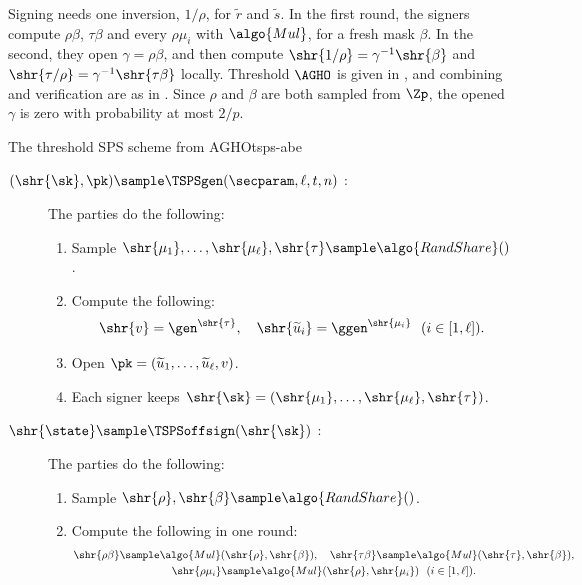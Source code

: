 Signing needs one inversion, $1/\rho$, for $\widetilde{r}$ and
$\widetilde{s}$. In the first round, the signers compute $\rho\beta$,
$\tau\beta$ and every $\rho\mu_i$ with $\algo{Mul}$, for a fresh mask $\beta$.
In the second, they open $\gamma = \rho\beta$, and then compute $\shr{1/\rho} =
\gamma^{-1}\shr{\beta}$ and $\shr{\tau/\rho} = \gamma^{-1}\shr{\tau\beta}$
locally. Threshold $\AGHO$ is given in , and combining and
verification are as in . Since $\rho$ and $\beta$ are
both sampled from $\Zp$, the opened $\gamma$ is zero with probability at most
$2/p$.

\begin{protocolbox}{The threshold SPS scheme from AGHO}{tsps-abe}

  \begin{description}

    \item[$(\shr{\sk}, \pk) \sample \TSPSgen(\secparam, \ell, t, n)$ :] The
parties do the following:

      \begin{enumerate}

	\item Sample $\shr{\mu_1}, \ldots, \shr{\mu_\ell}, \shr{\tau} \sample
\algo{RandShare}()$.

	\item Compute the following:
	  \begin{equation*}
	    \shr{v} = \gen^{\shr{\tau}}, \quad \shr{\widetilde{u}_i} = \ggen^{\shr{\mu_i}} \ \ (i \in [1,\ell]).
	  \end{equation*}

	\item Open $\pk = (\widetilde{u}_1, \ldots, \widetilde{u}_\ell, v)$.

	\item Each signer keeps $\shr{\sk} = (\shr{\mu_1}, \ldots,
\shr{\mu_\ell}, \shr{\tau})$.

      \end{enumerate}

    \item[$\shr{\state} \sample \TSPSoffsign(\shr{\sk})$ :] The parties do the
following:

      \begin{enumerate}

	\item Sample $\shr{\rho}, \shr{\beta} \sample \algo{RandShare}()$.

	\item Compute the following in one round:
	  \begin{gather*}
	    \shr{\rho\beta} \sample \algo{Mul}(\shr{\rho}, \shr{\beta}), \quad
\shr{\tau\beta} \sample \algo{Mul}(\shr{\tau}, \shr{\beta}), \\
	    \shr{\rho\mu_i} \sample \algo{Mul}(\shr{\rho}, \shr{\mu_i}) \ \ (i
\in [1,\ell]).
	  \end{gather*}


\end{enumerate}
\end{description}
\end{protocolbox}

